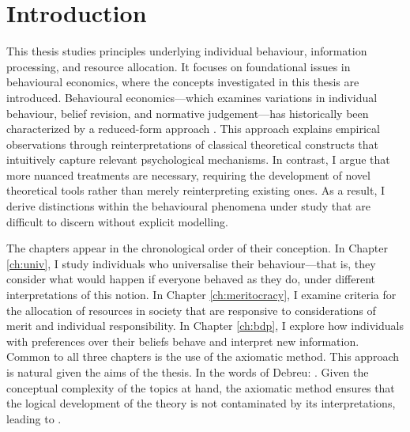 \chapter*{Introduction}\label{ch:intro} %

This thesis studies principles underlying individual behaviour, information processing, and resource allocation. It focuses on foundational issues in behavioural economics, where the concepts investigated in this thesis are introduced. Behavioural economics—which examines variations in individual behaviour, belief revision, and normative judgement—has historically been characterized by a reduced-form approach \citep{spieglerBehavioralEconomicsAtheoretical2019}. This approach explains empirical observations through reinterpretations of classical theoretical constructs that intuitively capture relevant psychological mechanisms. In contrast, I argue that more nuanced treatments are necessary, requiring the development of novel theoretical tools rather than merely reinterpreting existing ones. As a result, I derive distinctions within the behavioural phenomena under study that are difficult to discern without explicit modelling.

The chapters appear in the chronological order of their conception. In Chapter \ref{ch:univ}, I study individuals who universalise their behaviour—that is, they consider what would happen if everyone behaved as they do, under different interpretations of this notion. In Chapter \ref{ch:meritocracy}, I examine criteria for the allocation of resources in society that are responsive to considerations of merit and individual responsibility. In Chapter \ref{ch:bdp}, I explore how individuals with preferences over their beliefs behave and interpret new information. Common to all three chapters is the use of the axiomatic method. This approach is natural given the aims of the thesis. In the words of Debreu:  \citep[p. x]{debreuTheoryValueAxiomatic1959}. Given the conceptual complexity of the topics at hand, the axiomatic method ensures that the logical development of the theory is not contaminated by its interpretations, leading to  \citep[p. x]{debreuTheoryValueAxiomatic1959}.


